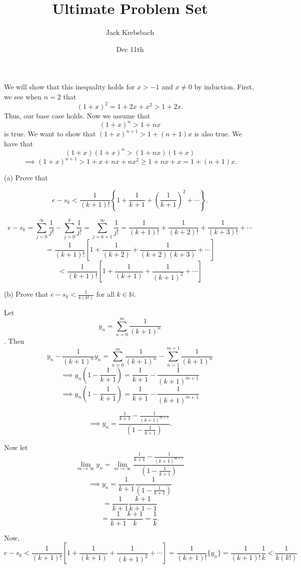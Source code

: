 \documentclass{report}
\title{Ultimate Problem Set}
\author{Jack Krebsbach }
\date{Dec 11th}
\begin{document}
\maketitle




\begin{myproof}
We will show that this inequality holds for $x>-1$ and $x\not= 0$ by induction. First, we see when $n=2$ that $$ (1+x)^2 = 1 +2x + x^2 > 1+2x.$$ Thus, our base case holds. Now we assume that $$ (1+x)^n > 1 +nx$$ is true. We want to show that
$ (1+x)^{n+1} > 1 +(n+1)x$
is also true. We have that $$(1+x)(1+x)^n > (1+nx)(1+x)$$
$$ \implies (1+x)^{n+1} > 1 + x + nx + nx^2 \geq 1 + nx + x = 1 + (n+1)x.$$

\end{myproof}

\pagebreak
{}

(a) Prove that

$$
e-s_k<\frac{1}{(k+1) !}\left\{1+\frac{1}{k+1}+\left(\frac{1}{k+1}\right)^2+\cdots\right\} .
$$

$$ e-s_k = \sum_{j=0}^{\infty} \frac{1}{j !} - \sum_{j=0}^k \frac{1}{j !} = \sum_{j=k+1}^{\infty} \frac{1}{j !} = \frac{1}{(k+1)!} +\frac{1}{(k+2)!}+ \frac{1}{(k+3)!} + \cdots$$ $$= \frac{1}{(k+1)!}\left[1 + \frac{1}{(k+2)}  + \frac{1}{(k+2)(k+3)} + \cdots \right]$$
$$< \frac{1}{(k+1)!}\left[1 + \frac{1}{(k+1)}  + \frac{1}{(k+1)^2} + \cdots \right]$$
\bigskip

\bigskip
(b) Prove that $e-s_k<\frac{1}{k(k!)}$ for all $k \in \mathbb{N}$.

\begin{myproof}
  Let $$ y_n = \sum_{n=0}^{m} \frac{1}{(k+1)^n} $$. Then $$y_n - \frac{1}{(k+1)^n} y_n = \sum_{n=0}^{m} \frac{1}{(k+1)^n} - \sum_{n=1}^{m+1} \frac{1}{(k+1)^n} $$ 
  $$\implies y_n\left(1 - \frac{1}{k+1}\right) = \frac{1}{k+1} - \frac{1}{(k+1)^{m+1}} $$   
  $$\implies y_n\left(1 - \frac{1}{k+1}\right) = \frac{1}{k+1} - \frac{1}{(k+1)^{m+1}} $$

$$\implies y_n = \frac{\frac{1}{k+1} - \frac{1}{(k+1)^{m+1}}}{\left(1 - \frac{1}{k+1}\right)}.$$


Now let $$ \lim_{m \rightarrow \infty} y_n = \lim_{m \rightarrow \infty}\frac{\frac{1}{k+1} - \frac{1}{(k+1)^{m+1}}}{\left(1 - \frac{1}{k+1}\right)}$$
$$ \implies y_n = \frac{1}{k+1}\frac{1}{\left(1 - \frac{1}{k+1}\right)}$$
$$  = \frac{1}{k+1}\frac{k+1}{k+1-1}$$
$$  = \frac{1}{k+1}\frac{k+1}{k} = \frac{1}{k}.$$


Now, $$ e - s_k  < \frac{1}{(k+1)!}\left[1 + \frac{1}{(k+1)}  + \frac{1}{(k+1)^2} + \cdots \right] = \frac{1}{(k+1)!}\{y_n\} = \frac{1}{(k+1)!} \frac{1}{k} < \frac{1}{k(k!)}$$
\end{myproof}
\end{document}
